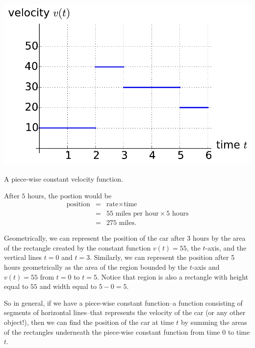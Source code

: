 \begin{marginfigure}[.5in] %
\includegraphics[width=\marginparwidth]{figs/0/piecewise_constant_velocity.pdf}
\caption{A piece-wise constant velocity function.}
\label{fig:0-piecewise_constant_velocity}
\end{marginfigure}

After $5$ hours, the postion would be
\begin{eqnarray*}
\mbox{position}	& = & \mbox{rate} \times \mbox{time} \\
& = & 55 \mbox{ miles per hour} \times 5 \mbox{ hours} \\
& = & 275 \mbox{ miles.} 
\end{eqnarray*}

Geometrically, we can represent the position of the car after 3 hours by the area of the rectangle created by the constant function $v(t) = 55$, the $t$-axis, and the vertical lines $t = 0$ and $t = 3$.  Similarly, we can represent the position after 5 hours geometrically as the area of the region bounded by the $t$-axis and $v(t) = 55$ from $t = 0$ to $t = 5$.  Notice that  region is also a rectangle with height equal to $55$ and width equal to $5 - 0 = 5$.

So in general, if we have a piece-wise constant function--a function consisting of segments of horizontal lines--that represents the velocity of the car (or any other object!), then we can find the position of the car at time $t$ by summing the areas of the rectangles underneath the piece-wise constant function from time $0$ to time $t$.

